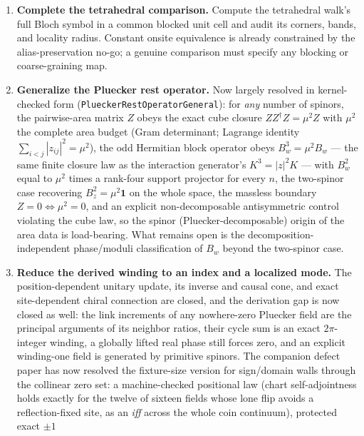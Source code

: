 \documentclass[11pt]{article}
\newcommand{\id}{\mathbf{1}}
\begin{document}
\begin{enumerate}[leftmargin=2em]
   class from an escape class with a nonzero $\Xi$-odd term whose constant and
   linear jets vanish; exact group-commutator loops are the first such candidate.
   Equations
   \eqref{eq:cornerparity} and \eqref{eq:bodycentermodes} are the regression
   tests.
  \item \textbf{Complete the tetrahedral comparison.}
  Compute the tetrahedral walk's full Bloch symbol in a common blocked unit
  cell and audit its corners, bands, and locality radius.  Constant onsite
  equivalence is already constrained by the alias-preservation no-go; a
  genuine comparison must specify any blocking or coarse-graining map.
  \item \textbf{Generalize the Pluecker rest operator.}
  Now largely resolved in kernel-checked form
  (\texttt{PlueckerRestOperatorGeneral}): for \emph{any} number of
  spinors, the pairwise-area matrix $Z$ obeys the exact cube closure
  $ZZ^\dagger Z=\mu^2 Z$ with $\mu^2$ the complete area budget (Gram
  determinant; Lagrange identity $\sum_{i<j}|z_{ij}|^2=\mu^2$), the odd
  Hermitian block operator obeys $B_w^3=\mu^2 B_w$ --- the same finite
  closure law as the interaction generator's $K^3=|z|^2K$ --- with
  $B_w^2$ equal to $\mu^2$ times a rank-four support projector for every
  $n$, the two-spinor case recovering $B_z^2=\mu^2\id$ on the whole
  space, the massless boundary $Z=0\iff\mu^2=0$, and an explicit
  non-decomposable antisymmetric control violating the cube law, so the
  spinor (Pluecker-decomposable) origin of the area data is
  load-bearing.  What remains open is the decomposition-independent
  phase/moduli classification of $B_w$ beyond the two-spinor case.
  \item \textbf{Reduce the derived winding to an index and a localized mode.}
  The position-dependent unitary update, its inverse and causal cone, and exact
  site-dependent chiral connection are closed, and the derivation gap is now
  closed as well: the link increments of any nowhere-zero Pluecker field are
  the principal arguments of its neighbor ratios, their cycle sum is an exact
  $2\pi$-integer winding, a globally lifted real phase still forces zero, and
  an explicit winding-one field is generated by primitive spinors.
  The companion defect paper has now resolved the fixture-size version
  for sign/domain walls through the collinear zero set: a machine-checked
  positional law (chart self-adjointness holds exactly for the twelve of
  sixteen fields whose lone flip avoids a reflection-fixed site, as an
  \emph{iff} across the whole coin continuum), protected exact $\pm1$

\end{enumerate}
\end{document}
